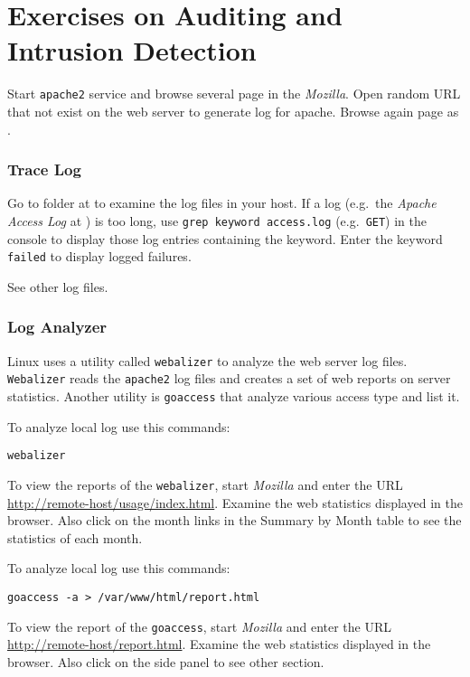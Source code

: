 \documentclass{../UTNetLab}
\begin{document}
\part{Exercises on Auditing and Intrusion Detection}
    Start \lstinline{apache2} service and browse several page in the \textit{Mozilla}. Open random URL that not exist on the web server to generate log for apache. Browse again page as .

\section{Trace Log}
    Go to  folder at  to examine the log files in your host. If a log (e.g.\ the \textit{Apache Access Log} at ) is too long, use \lstinline[emph={keyword}]{grep keyword access.log} (e.g.\ \texttt{GET}) in the {console} to display those log entries containing the keyword. Enter the keyword \texttt{failed} to display logged failures.

    See other log files.

\section{Log Analyzer}
    Linux uses a utility called \lstinline{webalizer} to analyze the web server log files. \lstinline{Webalizer} reads the \lstinline{apache2} log files and creates a set of web reports on server statistics. Another utility is \lstinline{goaccess} that analyze various access type and list it.

    To analyze local log use this commands:
    \begin{lstlisting}
webalizer
    \end{lstlisting}
    
    To view the reports of the \lstinline{webalizer}, start \textit{Mozilla} and enter the URL \url{http://remote-host/usage/index.html}. Examine the web statistics displayed in the browser. Also click on the month links in the Summary by Month table to see the statistics of each month.

    To analyze local log use this commands:
    \begin{lstlisting}
goaccess -a > /var/www/html/report.html
    \end{lstlisting}
    
    To view the report of the \lstinline{goaccess}, start \textit{Mozilla} and enter the URL \url{http://remote-host/report.html}. Examine the web statistics displayed in the browser. Also click on the side panel to see other section.
\end{document}
